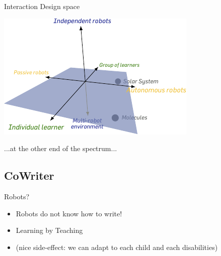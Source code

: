 \documentclass[compress]{beamer}
\begin{document}

{
 \begin{frame}{Interaction Design space}
     \begin{center}
         \includegraphics[width=0.8\linewidth]{cellulo/interaction-space}
     \end{center}
 \end{frame}
 }

 \begin{frame}[plain]{}
     ...at the other end of the spectrum...
 \end{frame}



 \subsection{CoWriter}



\begin{frame}{Robots?}
    \begin{itemize}
        \item<1-> Robots do not know how to write!
        \item<2-> Learning by Teaching
        \item<3-> (nice side-effect: we can adapt to each child and each disabilities)
    \end{itemize}
\end{frame}
\end{document}
